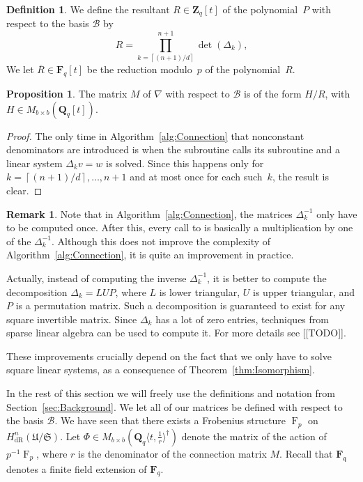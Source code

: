 \documentclass[a4paper,11pt]{article}
\numberwithin{equation}{section}
\providecommand{\ceil}[1]{\left\lceil#1\right\rceil}   %
\newcommand{\ZZ}{\mathbf{Z}} %
\newcommand{\QQ}{\mathbf{Q}} %
\newcommand{\FF}{\mathbf{F}} %
\DeclareMathOperator{\Frob}{F}           %
\providecommand{\HdR}{H_{\text{dR}}}    %
\providecommand{\cB}{\mathcal{B}} %
\theoremstyle{definition}
\newtheorem{prop}[thm]{Proposition}
\newtheorem{defn}[thm]{Definition}
\newtheorem{rem}[thm]{Remark}
\begin{document}
\begin{defn} \label{defn:resultant}
We define the resultant $R \in \ZZ_q[t]$ of the polynomial~$P$ with 
respect to the basis $\cB$ by
\[
R = \prod_{k=\ceil{(n+1)/d}}^{n+1}  \det(\Delta_k),
\]
We let $\overline{R} \in \FF_q[t]$ be the 
reduction modulo~$p$ of the polynomial~$R$.
\end{defn}

\begin{prop} \label{thm:denom}
The matrix $M$ of $\nabla$ with respect to $\cB$ is of the form
$H/R$, with $H \in M_{b \times b}(\QQ_q[t])$.
\end{prop}

\begin{proof}
The only time in Algorithm~\ref{alg:Connection} that nonconstant denominators 
are introduced is when the subroutine {} calls its subroutine 
{} and a linear system $\Delta_k v = w$ is solved. Since this 
happens only for $k=\ceil{(n+1)/d}, \dotsc, n+1$ and at most once for each 
such~$k$, the result is clear.
\end{proof}

\begin{rem} 
Note that in Algorithm~\ref{alg:Connection}, the matrices $\Delta_k^{-1}$ 
only have to be computed once. After this, every call to {} 
is basically a multiplication by one of the $\Delta_k^{-1}$.  Although this 
does not improve the complexity of Algorithm~\ref{alg:Connection}, it is 
quite an improvement in practice. 

Actually, instead of computing the inverse $\Delta_k^{-1}$, it is better 
to compute the decomposition $\Delta_k = L U P$, where $L$ is lower triangular, 
$U$ is upper triangular, and $P$ is a permutation matrix. Such a decomposition 
is guaranteed to exist for any square invertible matrix. Since $\Delta_k$ has 
a lot of zero entries, techniques from sparse linear algebra can be used to 
compute it. For more details see [[TODO]].


These improvements crucially depend on the fact that we only have to solve 
square linear systems, as a consequence of Theorem~\ref{thm:Isomorphism}.
\end{rem}

In the rest of this section we will freely use the definitions and notation 
from Section~\ref{sec:Background}. We let all of our matrices be defined with 
respect to the basis $\cB$. We have seen that there exists a Frobenius 
structure $\Frob_p$ on $\HdR^n(\mathfrak{U}/\mathfrak{S})$. Let 
$\Phi \in M_{b \times b}(\QQ_q \langle t, \frac{1}{r} \rangle^{\dag})$ 
denote the matrix of the action of $p^{-1}\Frob_p$, where $r$ is the 
denominator of the connection matrix $M$. Recall that $\FF_{\mathfrak{q}}$ 
denotes a finite field extension of $\FF_q$. 
\end{document}
